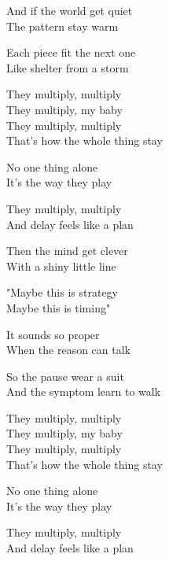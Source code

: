 \begin{lyrics}
And if the world get quiet\\
The pattern stay warm

Each piece fit the next one\\
Like shelter from a storm

They multiply, multiply\\
They multiply, my baby\\
They multiply, multiply\\
That's how the whole thing stay

No one thing alone\\
It's the way they play

They multiply, multiply\\
And delay feels like a plan

Then the mind get clever\\
With a shiny little line

"Maybe this is strategy\\
Maybe this is timing"

It sounds so proper\\
When the reason can talk

So the pause wear a suit\\
And the symptom learn to walk

They multiply, multiply\\
They multiply, my baby\\
They multiply, multiply\\
That's how the whole thing stay

No one thing alone\\
It's the way they play

They multiply, multiply\\
And delay feels like a plan
\end{lyrics}

